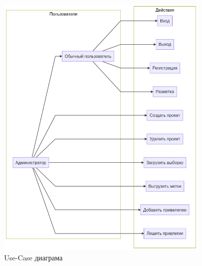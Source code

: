 \begin{figure}
    \caption{Use-Case диаграма}
    \includegraphics[width=0.9\textwidth]{./use-case.png}
\end{figure}
